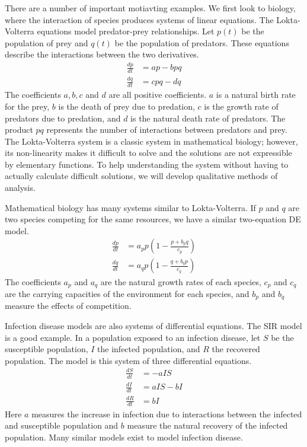 \documentclass[fleqn,letterpaper]{report}
\begin{document}
There are a number of important motiavting examples. We first
look to biology, where the interaction of species produces
systems of linear equations. The Lokta-Volterra equations 
model predator-prey relationships. Let $p(t)$ be
the population of prey and $q(t)$ be the population of
predators. These equations describe the
interactions between the two derivatives.
\begin{align*}
\frac{dp}{dt} & = ap - bpq \\
\frac{dq}{dt} & = cpq - dq
\end{align*}
The coefficients $a,b,c$ and $d$ are all positive
coefficients. $a$ is a natural birth rate for the prey, $b$
is the death of prey due to predation, $c$ is the growth rate
of predators due to predation, and $d$ is the natural death
rate of predators. The product $pq$ represents the number of
interactions between predators and prey. The Lokta-Volterra
system is a classic system in mathematical biology;
however, its non-linearity makes it difficult to solve and the
solutions are not expressible by elementary functions. To help
understanding the system without having to actually calculate
difficult solutions, we will develop qualitative methods of
analysis.

Mathematical biology has many systems similar to
Lokta-Volterra. If $p$ and $q$ are two species competing for
the same resources, we have a similar two-equation DE model.
\begin{align*}
\frac{dp}{dt} & = a_pp\left(1- \frac{p + b_p q}{c_p} \right) \\
\frac{dq}{dt} & = a_qp\left(1- \frac{q + b_q p}{c_q} \right)
\end{align*}
The coefficients $a_p$ and $a_q$ are the natural growth rates
of each species, $c_p$ and $c_q$ are the carrying capacities of
the environment for each species, and $b_p$ and $b_q$
measure the effects of competition. 

Infection disease models are also systems of differential
equations. The SIR model is a good example. In a population
exposed to an infection disease, let $S$ be the susceptible
population, $I$ the infected population, and $R$ the recovered
population. The model is this system of three
differential equations.
\begin{align*}
\frac{dS}{dt} & = -a I S \\
\frac{dI}{dt} & = a I S - b I \\
\frac{dR}{dt} & = b I 
\end{align*}
Here $a$ measures the increase in infection due to interactions
between the infected and susceptible population and $b$
measure the natural recovery of the infected population. Many
similar models exist to model infection disease.
\end{document}
